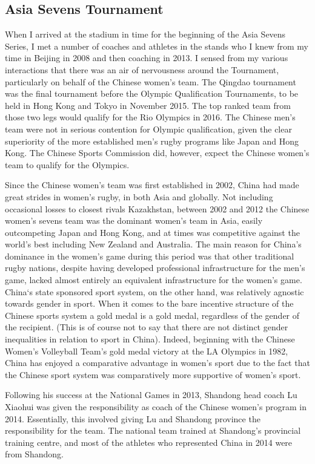   \subsection{Asia Sevens Tournament}
  When I arrived at the stadium in time for the beginning of the Asia Sevens Series, I met a number of coaches and athletes in the stands who I knew from my time in Beijing in 2008 and then coaching in 2013. I sensed from my various interactions that there was an air of nervousness around the Tournament, particularly on behalf of the Chinese women's team.   The Qingdao tournament was the final tournament before the Olympic Qualification Tournaments, to be held in Hong Kong and Tokyo in November 2015.  The top ranked team from those two legs would qualify for the Rio Olympics in 2016.  The Chinese men's team were not in serious contention for Olympic qualification, given the clear superiority of the more established men's rugby programs like Japan and Hong Kong. The Chinese Sports Commission did, however, expect the Chinese women's team to qualify for the Olympics.

  Since the Chinese women's team was first established in 2002, China had made great strides in women's rugby, in both Asia and globally.  Not including occasional losses to closest rivals Kazakhstan, between 2002 and 2012 the Chinese women's sevens team was the dominant women's team in Asia, easily outcompeting Japan and Hong Kong, and at times was competitive against the world's best including New Zealand and Australia.  The main reason for China's dominance in the women's game during this period was that other traditional rugby nations, despite having developed professional infrastructure for the men's game, lacked almost entirely an equivalent infrastructure for the women's game. China`s state sponsored sport system, on the other hand, was relatively agnostic towards gender in sport. When it comes to the bare incentive structure of the Chinese sports system a gold medal is a gold medal, regardless of the gender of the recipient. (This is of course not to say that there are not distinct gender inequalities in relation to sport in China).  Indeed, beginning with the Chinese Women's Volleyball Team's gold medal victory at the LA Olympics in 1982, China has enjoyed a comparative advantage in women's sport due to the fact that the Chinese sport system was comparatively more supportive of women's sport.

  Following his success at the National Games in 2013, Shandong head coach Lu Xiaohui was given the responsibility as coach of the Chinese women's program in 2014.  Essentially, this involved giving Lu and  Shandong province the responsibility for the team.  The national team trained at Shandong's provincial training centre, and most of the athletes who represented China in 2014 were from Shandong.

